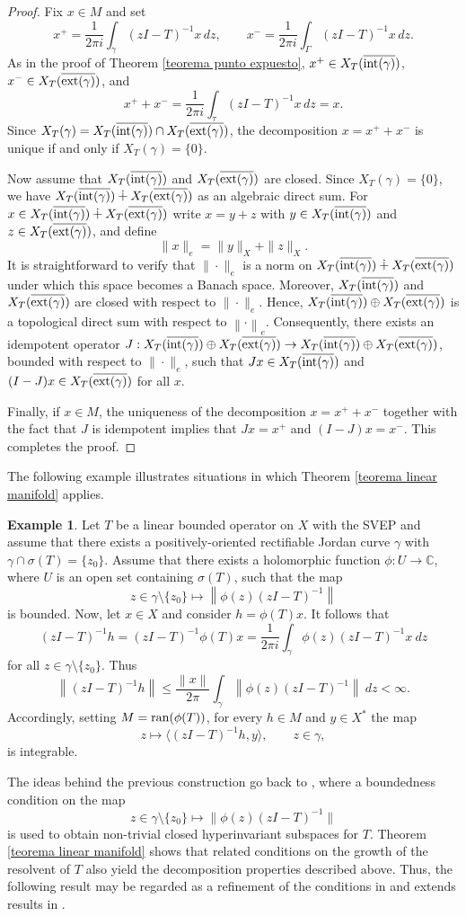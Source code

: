 \documentclass[11pt]{amsart}
\theoremstyle{definition}
\newtheorem{example}[theorem]{Example}
\theoremstyle{remark}
\numberwithin{equation}{section}
\newcommand{\norm}[1]{\left\|#1\right\|}
\newcommand{\ran}{\textnormal{ran}}
\newcommand{\C}{\mathbb{C}}
\newcommand{\Xint}{X_T(\overline{\inte(\gamma)})}
\newcommand{\Xext}{X_T(\overline{\exte(\gamma)})}
\newcommand{\inte}{\textnormal{int}}
\newcommand{\exte}{\textnormal{ext}}
\begin{document}
\begin{proof}
Fix $x\in M$ and set
$$
x^+ = \frac{1}{2\pi i}\int_\gamma (zI-T)^{-1}x\,dz,
\qquad
x^- = \frac{1}{2\pi i}\int_\Gamma (zI-T)^{-1}x\,dz.
$$
As in the proof of Theorem \ref{teorema punto expuesto}, $x^+\in\Xint$, $x^-\in\Xext$, and
$$
x^++x^-=\frac{1}{2\pi i}\int_\tau (zI-T)^{-1}x\,dz=x.
$$
Since $X_T(\gamma)=\Xint\cap\Xext$, the decomposition $x=x^++x^-$ is unique if and only if $X_T(\gamma)=\{0\}$.

\smallskip

Now assume that $\Xint$ and $\Xext$ are closed. Since $X_T(\gamma)=\{0\}$, we have
$\Xint\dotplus\Xext$ as an algebraic direct sum. For $x\in \Xint\dotplus\Xext$ write
$x=y+z$ with $y\in\Xint$ and $z\in\Xext$, and define
$$
\|x\|_e=\|y\|_X+\|z\|_X .
$$
It is straightforward to verify that $\|\cdot\|_e$ is a norm on $\Xint\dotplus\Xext$
under which this space becomes a Banach space. Moreover, $\Xint$ and $\Xext$
are closed with respect to $\|\cdot\|_e$. Hence, $\Xint\oplus\Xext$ is a topological
direct sum with respect to $\norm{\cdot}_e$. Consequently, there exists an idempotent operator
$J:\Xint\oplus\Xext\to\Xint\oplus \Xext$, bounded with respect to $\|\cdot\|_e$, such that
$Jx\in\Xint$ and $(I-J)x\in\Xext$ for all $x$.

Finally, if $x\in M$, the uniqueness of the decomposition $x=x^++x^-$ together
with the fact that $J$ is idempotent implies that $Jx=x^+$ and $(I-J)x=x^-$.
This completes the proof.
\end{proof}

The following example illustrates situations in which Theorem \ref{teorema linear manifold} applies.

\begin{example}
    Let $T$ be a linear bounded operator on $X$ with the SVEP and assume that there exists a positively-oriented rectifiable Jordan curve $\gamma$ with $\gamma\cap\sigma(T) = \{z_0\}$. Assume that there exists a holomorphic function $\phi : U\rightarrow \C$, where $U$ is an open set containing $\sigma(T)$, such that the map
    $$z\in \gamma\setminus\{z_0\}\mapsto  \norm{\phi(z)(z I-T)^{-1}}$$
    is bounded. Now, let $x \in X$ and consider $h=\phi(T)x$. It follows that
    $$(z I-T)^{-1}h = (z I-T)^{-1}\phi(T)x = \frac{1}{2\pi i}\int_\gamma \phi(z)(z I-T)^{-1} x\ dz $$ for all $z\in \gamma\setminus\{z_0\}$. Thus
    $$
    \norm{(z I-T)^{-1}h} \leq \frac{\norm{x}}{2\pi} \int_\gamma \norm{\phi(z)(z I-T)^{-1}}\ dz < \infty.
    $$
  Accordingly, setting $M=\ran(\phi(T))$, for every $h\in M$ and $y\in X^*$ the map
$$
z\mapsto \langle (zI-T)^{-1}h,y\rangle, \qquad z\in\gamma,
$$
is integrable.
\end{example}
The ideas behind the previous construction go back to \cite{Stampfli}, where a boundedness condition on the map
$$
z\in \gamma\setminus\{z_0\}\longmapsto \|\phi(z)(zI-T)^{-1}\|
$$
is used to obtain non-trivial closed hyperinvariant subspaces for $T$.
Theorem \ref{teorema linear manifold} shows that related conditions on the growth of the resolvent of $T$ also yield the decomposition properties described above.
Thus, the following result may be regarded as a refinement of the conditions in \cite{Stampfli} and extends results in \cite{Chalendar1997, Chalendar1998}.
\end{document}
